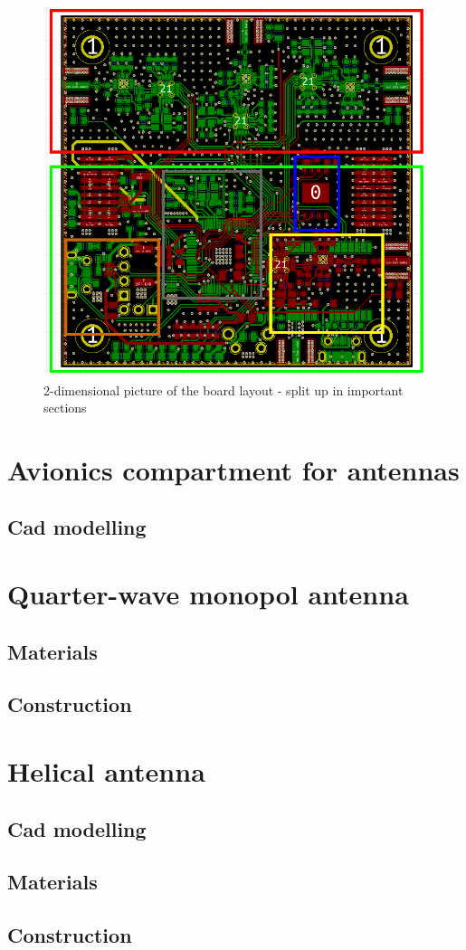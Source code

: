 \begin{figure}[h!]
\centering
\includegraphics[scale=0.8]{figures/TelemetryBoardDesignFinished.PNG}
\caption{2-dimensional picture of the board layout - split up in important sections}
\end{figure}

\newpage

\section{Avionics compartment for antennas}

\subsection{Cad modelling}

\section{Quarter-wave monopol antenna}

\subsection{Materials}

\subsection{Construction}

\section{Helical antenna}

\subsection{Cad modelling}

\subsection{Materials}

\subsection{Construction}